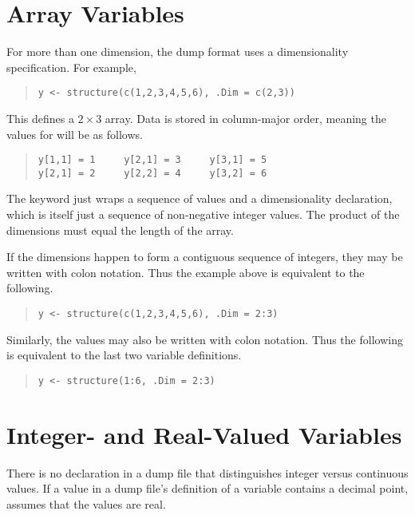 \section{Array Variables}

For more than one dimension, the dump format uses a dimensionality
specification.  For example,
%
\begin{quote}
\begin{verbatim}
y <- structure(c(1,2,3,4,5,6), .Dim = c(2,3))
\end{verbatim}
\end{quote}
%
This defines a $2 \times 3$ array.  Data is stored in column-major
order, meaning the values for  will be as follows.
%
\begin{quote}
\begin{Verbatim}
y[1,1] = 1     y[2,1] = 3     y[3,1] = 5    
y[2,1] = 2     y[2,2] = 4     y[3,2] = 6
\end{Verbatim}
\end{quote}
%
The  keyword just wraps a sequence of values and a
dimensionality declaration, which is itself just a sequence of
non-negative integer values.  The product of the dimensions must equal
the length of the array.

If the dimensions happen to form a contiguous sequence of integers,
they may be written with colon notation.  Thus the example above is
equivalent to the following.
%
\begin{quote}
\begin{verbatim}
y <- structure(c(1,2,3,4,5,6), .Dim = 2:3)
\end{verbatim}
\end{quote}
%
Similarly, the values may also be written with colon notation.  Thus
the following is equivalent to the last two variable definitions.
%
\begin{quote}
\begin{verbatim}
y <- structure(1:6, .Dim = 2:3)
\end{verbatim}
\end{quote}



\section{Integer- and Real-Valued Variables}

There is no declaration in a dump file that distinguishes integer
versus continuous values.  If a value in a dump file's definition of a
variable contains a decimal point, \Stan assumes that the values are
real.  

